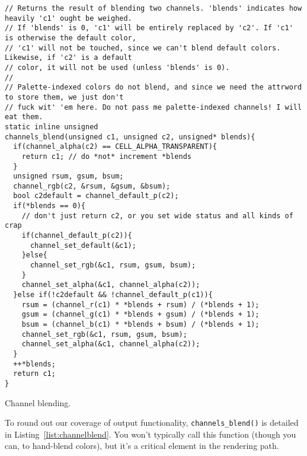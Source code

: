 \begin{listing}[!htb]
\begin{verbatim}
// Returns the result of blending two channels. 'blends' indicates how heavily 'c1' ought be weighed.
// If 'blends' is 0, 'c1' will be entirely replaced by 'c2'. If 'c1' is otherwise the default color,
// 'c1' will not be touched, since we can't blend default colors. Likewise, if 'c2' is a default
// color, it will not be used (unless 'blends' is 0).
//
// Palette-indexed colors do not blend, and since we need the attrword to store them, we just don't
// fuck wit' 'em here. Do not pass me palette-indexed channels! I will eat them.
static inline unsigned
channels_blend(unsigned c1, unsigned c2, unsigned* blends){
  if(channel_alpha(c2) == CELL_ALPHA_TRANSPARENT){
    return c1; // do *not* increment *blends
  }
  unsigned rsum, gsum, bsum;
  channel_rgb(c2, &rsum, &gsum, &bsum);
  bool c2default = channel_default_p(c2);
  if(*blends == 0){
    // don't just return c2, or you set wide status and all kinds of crap
    if(channel_default_p(c2)){
      channel_set_default(&c1);
    }else{
      channel_set_rgb(&c1, rsum, gsum, bsum);
    }
    channel_set_alpha(&c1, channel_alpha(c2));
  }else if(!c2default && !channel_default_p(c1)){
    rsum = (channel_r(c1) * *blends + rsum) / (*blends + 1);
    gsum = (channel_g(c1) * *blends + gsum) / (*blends + 1);
    bsum = (channel_b(c1) * *blends + bsum) / (*blends + 1);
    channel_set_rgb(&c1, rsum, gsum, bsum);
    channel_set_alpha(&c1, channel_alpha(c2));
  }
  ++*blends;
  return c1;
}
\end{verbatim}
\caption{Channel blending.}
\label{list:channelblend}
\end{listing}

To round out our coverage of output functionality, \texttt{channels\_blend()}
is detailed in Listing~\ref{list:channelblend}. You won't typically call this
function (though you can, to hand-blend colors), but it's a critical element in
the rendering path.
